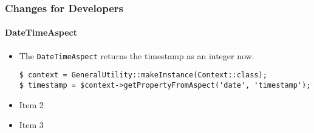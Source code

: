 %

\begin{frame}[fragile]
	\frametitle{Changes for Developers}
	\framesubtitle{DateTimeAspect}

	\begin{itemize}
		\item The \texttt{DateTimeAspect} returns the timestamp as an integer now.
\begin{lstlisting}
$ context = GeneralUtility::makeInstance(Context::class);
$ timestamp = $context->getPropertyFromAspect('date', 'timestamp');
\end{lstlisting}

		\item Item 2
		\item Item 3
	\end{itemize}

\end{frame}

